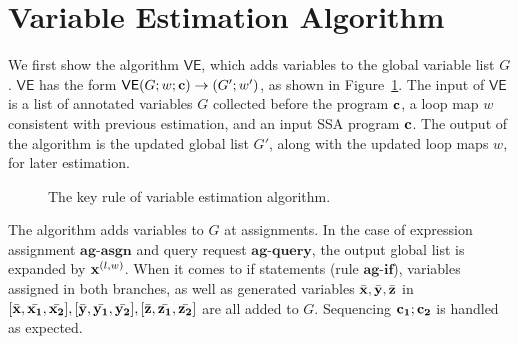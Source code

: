 \section{Variable Estimation Algorithm}
\label{sec:adapt-ve}
We first show the algorithm $\mathsf{VE}$, which adds variables to the global variable list $G$. $\mathsf{VE}$ has the form $\mathsf{VE}{(G; w; {\bf{{c}}})}\to {( G'; w')} $, as shown in Figure~\ref{fig:ag}. The input of $\mathsf{VE}$ is a list of annotated variables $G$ collected before the program ${\bf{{c}}}$, a loop map $w$ consistent with previous estimation, and an input SSA program ${\bf{{c}}}$. The output of the algorithm is the updated global list $G'$, along with the updated loop maps $w$, for later estimation.   
{\footnotesize
\begin{figure}
 \caption{The key rule of variable estimation algorithm.  }
    \label{fig:ag}
\end{figure}
}

The algorithm adds variables to $G$ at assignments. In the case of expression assignment $\textbf{ag-asgn}$ and query request $\textbf{ag-query}$, the output global list is expanded by ${\bf{{x}}}^{(l,w)}$. When it comes to if statements (rule $\textbf{ag-if}$), variables assigned in both branches, as well as generated variables $\bar{{\bf{{x}}}},\bar{{\bf{{y}}}},\bar{{\bf{{z}}}}$ in $ [ \bar{{\bf{{x}}}}, \bar{{\bf{{x_1}}}}, \bar{{\bf{{x_2}}}}] ,[ \bar{{\bf{{y}}}}, \bar{{\bf{{y_1}}}}, \bar{{\bf{{y_2}}}}],[ \bar{{\bf{{z}}}}, \bar{{\bf{{z_1}}}}, \bar{{\bf{{z_2}}}}]$ are all added to $G$. Sequencing ${\bf{{c_1;c_2}}}$ is handled as expected.

